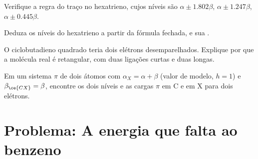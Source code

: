\begin{exercise}[$\star\star$]\label{exo:b2:huckel:9}
Verifique a regra do traço no hexatrieno, cujos níveis são $\alpha \pm 1.802\beta$, $\alpha \pm
1.247\beta$, $\alpha \pm 0.445\beta$.
\end{exercise}

\begin{exercise}[$\star\star\star$]\label{exo:b2:huckel:10}
Deduza os níveis do hexatrieno a partir da fórmula fechada, e sua .
\end{exercise}

\begin{exercise}[$\star\star\star$]\label{exo:b2:huckel:11}
O ciclobutadieno quadrado teria dois elétrons desemparelhados. Explique por que
a molécula real é retangular, com duas ligações curtas e duas longas.
\end{exercise}

\begin{exercise}[$\star\star\star$]\label{exo:b2:huckel:12}
Em um sistema $\pi$ de dois átomos  com $\alpha_X = \alpha + \beta$ (valor de modelo, $h = 1$) e
$\beta_{\ce{CX}} = \beta$, encontre os dois níveis e as cargas $\pi$ em C e em X para
dois elétrons.
\end{exercise}

\section{Problema: A energia que falta ao benzeno}

